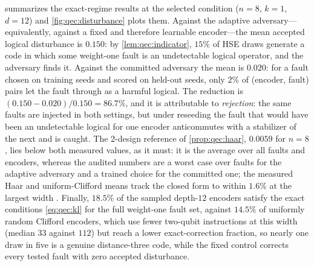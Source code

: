  summarizes the exact-regime results at the selected condition ($n=8$, $k=1$, $d=12$) and \cref{fig:qec:disturbance} plots them. Against the adaptive adversary---equivalently, against a fixed and therefore learnable encoder---the mean accepted logical disturbance is $0.150$: by \cref{lem:qec:indicator}, $15\%$ of HSE draws generate a code in which some weight-one fault is an undetectable logical operator, and the adversary finds it. Against the committed adversary the mean is $0.020$: for a fault chosen on training seeds and scored on held-out seeds, only $2\%$ of (encoder, fault) pairs let the fault through as a harmful logical. The reduction is $(0.150-0.020)/0.150=86.7\%$, and it is attributable to \emph{rejection}: the same faults are injected in both settings, but under reseeding the fault that would have been an undetectable logical for one encoder anticommutes with a stabilizer of the next and is caught. The 2-design reference of \cref{prop:qec:haar}, $0.0059$ for $n=8$, lies below both measured values, as it must: it is the average over all faults and encoders, whereas the audited numbers are a worst case over faults for the adaptive adversary and a trained choice for the committed one; the measured Haar and uniform-Clifford means track the closed form to within $1.6\%$ at the largest width \cite{guo2026qecaudit}. Finally, $18.5\%$ of the sampled depth-$12$ encoders satisfy the exact conditions \cref{eq:qec:kl} for the full weight-one fault set, against $14.5\%$ of uniformly random Clifford encoders, which use fewer two-qubit instructions at this width (median $33$ against $112$) but reach a lower exact-correction fraction, so nearly one draw in five is a genuine distance-three code, while the fixed  control corrects every tested fault with zero accepted disturbance.

